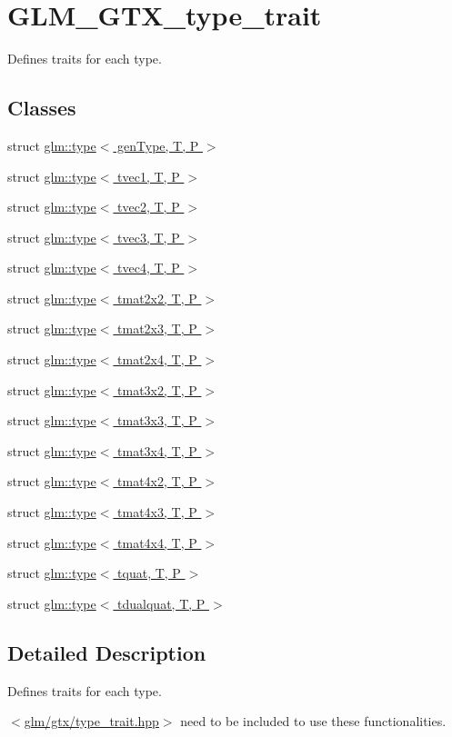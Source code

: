 \hypertarget{group__gtx__type__trait}{}\section{G\+L\+M\+\_\+\+G\+T\+X\+\_\+type\+\_\+trait}
\label{group__gtx__type__trait}


Defines traits for each type.  


\subsection*{Classes}
\begin{DoxyCompactItemize}
\item 
struct \hyperlink{structglm_1_1type}{glm\+::type$<$ gen\+Type, T, P $>$}
\item 
struct \hyperlink{structglm_1_1type_3_01tvec1_00_01T_00_01P_01_4}{glm\+::type$<$ tvec1, T, P $>$}
\item 
struct \hyperlink{structglm_1_1type_3_01tvec2_00_01T_00_01P_01_4}{glm\+::type$<$ tvec2, T, P $>$}
\item 
struct \hyperlink{structglm_1_1type_3_01tvec3_00_01T_00_01P_01_4}{glm\+::type$<$ tvec3, T, P $>$}
\item 
struct \hyperlink{structglm_1_1type_3_01tvec4_00_01T_00_01P_01_4}{glm\+::type$<$ tvec4, T, P $>$}
\item 
struct \hyperlink{structglm_1_1type_3_01tmat2x2_00_01T_00_01P_01_4}{glm\+::type$<$ tmat2x2, T, P $>$}
\item 
struct \hyperlink{structglm_1_1type_3_01tmat2x3_00_01T_00_01P_01_4}{glm\+::type$<$ tmat2x3, T, P $>$}
\item 
struct \hyperlink{structglm_1_1type_3_01tmat2x4_00_01T_00_01P_01_4}{glm\+::type$<$ tmat2x4, T, P $>$}
\item 
struct \hyperlink{structglm_1_1type_3_01tmat3x2_00_01T_00_01P_01_4}{glm\+::type$<$ tmat3x2, T, P $>$}
\item 
struct \hyperlink{structglm_1_1type_3_01tmat3x3_00_01T_00_01P_01_4}{glm\+::type$<$ tmat3x3, T, P $>$}
\item 
struct \hyperlink{structglm_1_1type_3_01tmat3x4_00_01T_00_01P_01_4}{glm\+::type$<$ tmat3x4, T, P $>$}
\item 
struct \hyperlink{structglm_1_1type_3_01tmat4x2_00_01T_00_01P_01_4}{glm\+::type$<$ tmat4x2, T, P $>$}
\item 
struct \hyperlink{structglm_1_1type_3_01tmat4x3_00_01T_00_01P_01_4}{glm\+::type$<$ tmat4x3, T, P $>$}
\item 
struct \hyperlink{structglm_1_1type_3_01tmat4x4_00_01T_00_01P_01_4}{glm\+::type$<$ tmat4x4, T, P $>$}
\item 
struct \hyperlink{structglm_1_1type_3_01tquat_00_01T_00_01P_01_4}{glm\+::type$<$ tquat, T, P $>$}
\item 
struct \hyperlink{structglm_1_1type_3_01tdualquat_00_01T_00_01P_01_4}{glm\+::type$<$ tdualquat, T, P $>$}
\end{DoxyCompactItemize}


\subsection{Detailed Description}
Defines traits for each type. 

$<$\hyperlink{type__trait_8hpp}{glm/gtx/type\+\_\+trait.\+hpp}$>$ need to be included to use these functionalities. 